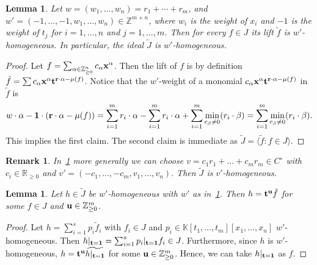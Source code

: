 \documentclass[10pt,a4paper]{amsart}
\newcommand{\thlabel}[1]{\label{#1}}
\newcommand{\thref}[1]{\ref{#1}}
\newtheorem{Lemma}[Theorem]{Lemma}
\newtheorem{Remark}[Theorem]{Remark}}
\numberwithin{equation}{section}
\begin{document}
\begin{Lemma}\thlabel{lem:w'homogeneous}
Let $w=(w_1,\dots,w_n)=r_1+\cdots+r_m$, and $w' = (-1,\ldots,-1,w_1,\ldots,w_n)\in \mathbb{Z}^{m+n}$, where $w_i$ is the weight of $x_i$ and $-1$ is the weight of $t_j$ for $i=1,\ldots,n$ and $j=1,\ldots,m$.
Then for every $f\in J$ its lift $\tilde f$ is $w'$-homogeneous.
In particular, the ideal $\tilde{J}$ is ${w'}$-homogeneous.
\end{Lemma}
\begin{proof}
Let $f=\sum_{\alpha\in \mathbb Z_{\ge 0}^n} c_\alpha{\bf x}^{\alpha}$.
Then the lift of $f$ is by definition $\tilde f=\sum c_\alpha{\bf x}^\alpha{\bf t}^{{\bf r}\cdot \alpha-\mu(f)}$.
Notice that the $w'$-weight of a monomial $c_\alpha{\bf x}^\alpha{\bf t}^{{\bf r}\cdot \alpha-\mu(f)}$ in $\tilde f$ is
\begin{displaymath}
w\cdot \alpha -{\bf 1}\cdot ({\bf r}\cdot \alpha-\mu(f)) = \sum_{i=1}^m r_i\cdot \alpha - \sum_{i=1}^m r_i\cdot \alpha + \sum_{i=1}^m \min_{c_\beta\not=0}(r_i\cdot \beta) = \sum_{i=1}^m \min_{c_\beta\not=0}(r_i\cdot \beta).
\end{displaymath}
This implies the first claim. The second claim is immediate as $\tilde J=\langle \tilde f\colon f\in J\rangle$.
\end{proof}

\begin{Remark}\thlabel{rmk:homogeneous weights}
In~\thref{lem:w'homogeneous} more generally we can choose
$v=c_1r_1+\dots+c_mr_m\in C^\circ$ with $c_i\in \mathbb R_{\ge 0}$ and $v'=(-c_1,\dots,-c_m,v_1,\dots,v_n).$
Then $\tilde J$ is $v'$-homogeneous.
\end{Remark}

\begin{Lemma}\thlabel{lem:homogeneous}
Let $h\in \tilde J$ be $w'$-homogeneous with $w'$ as in~\thref{lem:w'homogeneous}.
Then $h={\bf t}^{\bf u}\tilde{f}$ for some $f\in J$ and ${\bf u}\in \mathbb{Z}_{\geq 0}^m$.
\end{Lemma}

\begin{proof}
Let $h=\sum_{i=1}^s{p_i}\tilde{f}_i$ with $f_i\in J$ and $p_i\in\mathbb{K}[t_1,\ldots,t_m][x_1,\ldots,x_n]$ $w'$-homogeneous.
Then
$h\vert_{{\bf t}={\bf 1}}=\sum_{i=1}^s p_i\vert_{{\bf t}={\bf 1}}f_i\in J$. Furthermore, since $h$ is $w'$-homogeneous, $h={\bf t}^{\bf u}\widetilde{h\vert_{{\bf t}={\bf 1}}}$ for some ${\bf u}\in \mathbb{Z}_{\geq 0}^m$. Hence, we can take $h\vert_{{\bf t}={\bf 1}}$ as $f$.
\end{proof}
\end{document}
